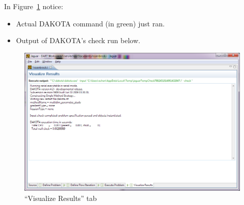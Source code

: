 In Figure~\ref{fig:input:5Visualize} notice:
\begin{itemize}
\item Actual DAKOTA command (in green) just ran.
\item Output of DAKOTA's check run below.
\end{itemize}
\begin{figure}[htbp]
  \centering
  \includegraphics[scale=0.6]{images/5Visualize}
  \caption{``Visualize Results'' tab}
  \label{fig:input:5Visualize}
\end{figure}


